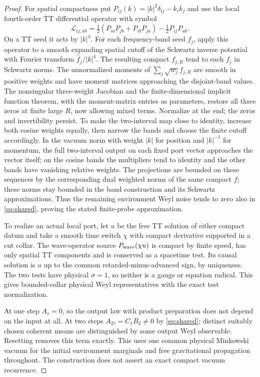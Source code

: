 \documentclass[11pt]{article}
\begin{document}
\begin{proof}
For spatial compactness put \(P_{ij}(k)=|k|^2\delta_{ij}-k_ik_j\) and use the local fourth-order TT differential operator with symbol
\[
 \mathcal L_{ij,ab}=
 \tfrac12(P_{ia}P_{jb}+P_{ib}P_{ja})-\tfrac12P_{ij}P_{ab}.
\]
On a TT seed it acts by \(|k|^4\). For each frequency-band seed \(f_j\), apply this operator to a smooth expanding spatial cutoff of the Schwartz inverse potential with Fourier transform \(\widehat f_j/|k|^4\). The resulting compact \(f_{j,R}\) tend to each \(f_j\) in Schwartz norms. The unnormalized moments of \(\sum_j\sqrt{w_j}f_{j,R}\) are smooth in positive weights and have moment matrices approaching the disjoint-band values. The nonsingular three-weight Jacobian and the finite-dimensional implicit function theorem, with the moment-matrix entries as parameters, restore all three zeros at finite large \(R\), now allowing mixed terms. Normalize at the end; the zeros and invertibility persist. To make the two-interval map close to identity, increase both cosine weights equally, then narrow the bands and choose the finite cutoff accordingly. In the vacuum norm with weight \(|k|\) for position and \(|k|^{-1}\) for momentum, the full two-interval output on each fixed port vector approaches the vector itself; on the cosine bands the multipliers tend to identity and the other bands have vanishing relative weights. The projections are bounded on these sequences by the corresponding dual weighted norms of the same compact \(f\); these norms stay bounded in the band construction and its Schwartz approximations. Thus the remaining environment Weyl noise tends to zero also in \eqref{eq:shared}, proving the stated finite-probe approximation.

To realize an actual local port, let \(u\) be the free TT solution of either compact datum and take a smooth time switch \(\chi\) with compact derivative supported in a cut collar. The wave-operator source \(P_{\rm wave}(\chi u)\) is compact by finite speed, has only spatial TT components and is conserved as a spacetime test. Its causal solution is \(u\) up to the common retarded-minus-advanced sign, by uniqueness. The two tests have physical \(\sigma=1\), so neither is a gauge or equation radical. This gives bounded-collar physical Weyl representatives with the exact test normalization.

At one step \(A_\tau=0\), so the output law with product preparation does not depend on the input at all. At two steps \(A_{2\tau}=C_1B_2\ne0\) by \eqref{eq:shared}; distinct suitably chosen coherent means are distinguished by some output Weyl observable. Resetting removes this term exactly. This uses one common physical Minkowski vacuum for the initial environment marginals and free gravitational propagation throughout. The construction does not assert an exact compact vacuum recurrence.
\end{proof}
\end{document}
